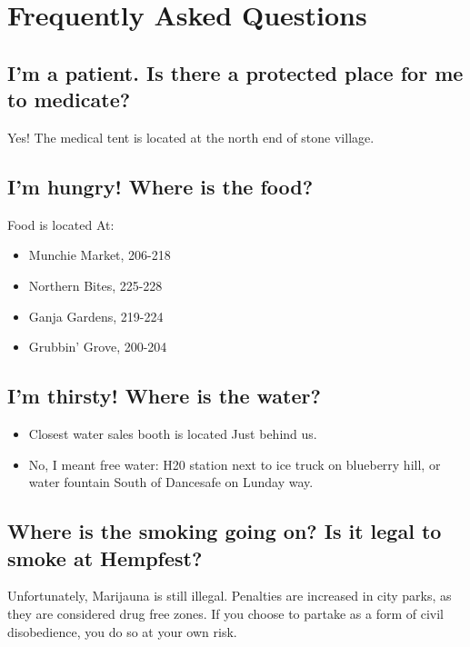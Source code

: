 \chapter{Frequently Asked Questions}


\section{I'm a patient. Is there a protected place for me to medicate?}

Yes! The medical tent is located at the north end of stone village. 

\section{I'm hungry! Where is the food?} %
 Food is located At:
\begin{itemize}
	\item Munchie Market, 206-218
	\item Northern Bites, 225-228
	\item Ganja Gardens, 219-224
	\item Grubbin' Grove, 200-204
\end{itemize}

\section{I'm thirsty! Where is the water?}
\begin{itemize}
	\item Closest water sales booth is located Just behind us.
	\item No, I meant free water: H20 station next to ice truck on blueberry hill, or water fountain South of Dancesafe on Lunday way.
\end{itemize}


\section{Where is the smoking going on? Is it legal to smoke at Hempfest?}
Unfortunately, Marijauna is still illegal. Penalties are increased in city parks, as they are considered drug free zones. If you choose to partake as a form of civil disobedience, you do so at your own risk. 

